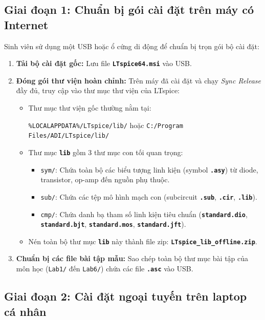 \documentclass[11pt,a4paper]{article}
\newcommand{\code}[1]{\texttt{\color{navy}\textbf{#1}}}
\newcommand{\pathdir}[1]{\texttt{\color{darkblue}#1}}
\begin{document}
\subsection{Giai đoạn 1: Chuẩn bị gói cài đặt trên máy có Internet}
Sinh viên sử dụng một USB hoặc ổ cứng di động để chuẩn bị trọn gói bộ cài đặt:
\begin{enumerate}[itemsep=3pt]
  \item \textbf{Tải bộ cài đặt gốc:} Lưu file \code{LTspice64.msi} vào USB.
  \item \textbf{Đóng gói thư viện hoàn chỉnh:}
  Trên máy đã cài đặt và chạy \textit{Sync Release} đầy đủ, truy cập vào thư mục thư viện của LTspice:
  \begin{itemize}
    \item Thư mục thư viện gốc thường nằm tại:
    \begin{center}
      \pathdir{\%LOCALAPPDATA\%/LTspice/lib/} \quad hoặc \quad \pathdir{C:/Program Files/ADI/LTspice/lib/}
    \end{center}
    \item Thư mục \code{lib} gồm 3 thư mục con tối quan trọng:
    \begin{itemize}
      \item \pathdir{sym/}: Chứa toàn bộ các biểu tượng linh kiện (symbol \code{.asy}) từ diode, transistor, op-amp đến nguồn phụ thuộc.
      \item \pathdir{sub/}: Chứa các tệp mô hình mạch con (subcircuit \code{.sub}, \code{.cir}, \code{.lib}).
      \item \pathdir{cmp/}: Chứa danh bạ tham số linh kiện tiêu chuẩn (\code{standard.dio}, \code{standard.bjt}, \code{standard.mos}, \code{standard.jft}).
    \end{itemize}
    \item Nén toàn bộ thư mục \code{lib} này thành file zip: \code{LTspice\_lib\_offline.zip}.
  \end{itemize}
  \item \textbf{Chuẩn bị các file bài tập mẫu:} Sao chép toàn bộ thư mục bài tập của môn học (\pathdir{Lab1/} đến \pathdir{Lab6/}) chứa các file \code{.asc} vào USB.
\end{enumerate}

\subsection{Giai đoạn 2: Cài đặt ngoại tuyến trên laptop cá nhân}
\end{document}
